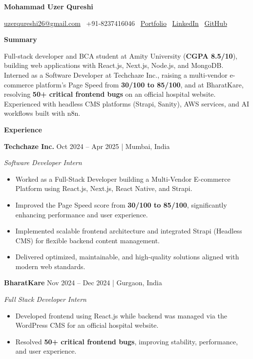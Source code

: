 \documentclass[10pt]{article}
\newcommand{\sectiontitle}[1]{%
  \par\vspace{8pt}%
  \noindent\textbf{\large #1}\par
  \vspace{-2pt}\noindent\hrulefill\par
  \vspace{4pt}%
}
\newcommand{\role}[3]{%
  \noindent\textbf{#1} \hfill #3\par
  \textit{#2}\par
  \vspace{3pt}%
}
\begin{document}
\vspace*{-8pt}
{\centering
  {\LARGE\textbf{Mohammad Uzer Qureshi}}\par
  \vspace{3pt}
  {\small \href{mailto:uzerqureshi26@gmail.com}{uzerqureshi26@gmail.com} \textbar\
  +91-8237416046 \textbar\
  \href{https://uzerqureshi-portfolio.netlify.app}{Portfolio} \textbar\
  \href{https://www.linkedin.com/in/uzairqureshi0803/}{LinkedIn} \textbar\
  \href{https://github.com/08Uzair}{GitHub}}\par
}

\sectiontitle{Summary}

Full-stack developer and BCA student at Amity University (\textbf{CGPA 8.5/10}), building web applications with React.js, Next.js, Node.js, and MongoDB. Interned as a Software Developer at Techchaze Inc., raising a multi-vendor e-commerce platform's Page Speed from \textbf{30/100 to 85/100}, and at BharatKare, resolving \textbf{50+ critical frontend bugs} on an official hospital website. Experienced with headless CMS platforms (Strapi, Sanity), AWS services, and AI workflows built with n8n.

\sectiontitle{Experience}

\role{Techchaze Inc.}{Software Developer Intern}{Oct 2024 -- Apr 2025 | Mumbai, India}
\begin{itemize}
  \item Worked as a Full-Stack Developer building a Multi-Vendor E-commerce Platform using React.js, Next.js, React Native, and Strapi.
  \item Improved the Page Speed score from \textbf{30/100 to 85/100}, significantly enhancing performance and user experience.
  \item Implemented scalable frontend architecture and integrated Strapi (Headless CMS) for flexible backend content management.
  \item Delivered optimized, maintainable, and high-quality solutions aligned with modern web standards.
\end{itemize}

\role{BharatKare}{Full Stack Developer Intern}{Nov 2024 -- Dec 2024 | Gurgaon, India}
\begin{itemize}
  \item Developed frontend using React.js while backend was managed via the WordPress CMS for an official hospital website.
  \item Resolved \textbf{50+ critical frontend bugs}, improving stability, performance, and user experience.
\end{itemize}
\end{document}
